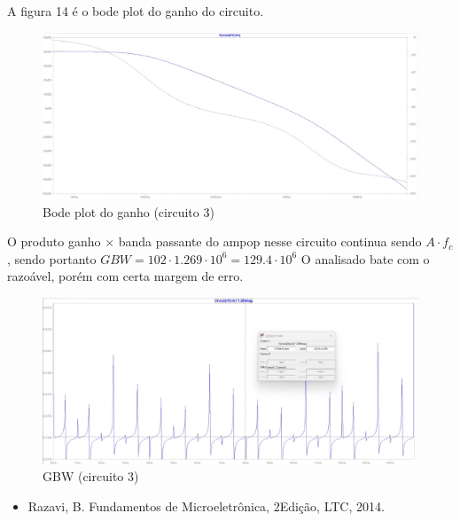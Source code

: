 \documentclass[10pt,twocolumn,letterpaper]{article}
\begin{document}
A figura 14 é o bode plot do ganho do circuito.

\begin{figure}[h]
\caption{Bode plot do ganho (circuito 3)}
\begin{center}
\includegraphics[scale=0.15]{figuras/fig14}
\end{center}
\end{figure}


O produto ganho $\times$ banda passante do ampop nesse circuito continua sendo $A\cdot f_c$, sendo portanto $GBW = 102\cdot1.269\cdot10^6=129.4\cdot10^6$ O analisado bate com o razoável, porém com certa margem de erro. 

\begin{figure}[h]
\caption{GBW (circuito 3)}
\begin{center}
\includegraphics[scale=0.15]{figuras/fig15}
\end{center}
\end{figure}



{\small


}

\begin{itemize}
\item Razavi, B. Fundamentos de Microeletrônica, 2\textordfeminine Edição, LTC, 2014.
\end{itemize}
\end{document}

